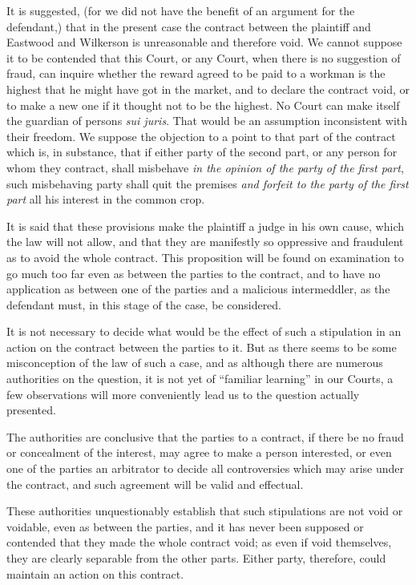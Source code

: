 \documentclass[
  letterpaper,
  11pt,
  DIV=9,
  openright]{scrbook}
\begin{document}
It is suggested, (for we did not have the benefit of an argument for the
defendant,) that in the present case the contract between the plaintiff
and Eastwood and Wilkerson is unreasonable and therefore void. We cannot
suppose it to be contended that this Court, or any Court, when there is
no suggestion of fraud, can inquire whether the reward agreed to be paid
to a workman is the highest that he might have got in the market, and to
declare the contract void, or to make a new one if it thought not to be
the highest. No Court can make itself the guardian of persons \emph{sui
juris}. That would be an assumption inconsistent with their freedom. We
suppose the objection to a point to that part of the contract which is,
in substance, that if either party of the second part, or any person for
whom they contract, shall misbehave \emph{in the opinion of the party of
the first part}, such misbehaving party shall quit the premises
\emph{and forfeit to the party of the first part} all his interest in
the common crop.

It is said that these provisions make the plaintiff a judge in his own
cause, which the law will not allow, and that they are manifestly so
oppressive and fraudulent as to avoid the whole contract. This
proposition will be found on examination to go much too far even as
between the parties to the contract, and to have no application as
between one of the parties and a malicious intermeddler, as the
defendant must, in this stage of the case, be considered.

It is not necessary to decide what would be the effect of such a
stipulation in an action on the contract between the parties to it. But
as there seems to be some misconception of the law of such a case, and
as although there are numerous authorities on the question, it is not
yet of ``familiar learning'' in our Courts, a few observations will more
conveniently lead us to the question actually presented.

The authorities are conclusive that the parties to a contract, if there
be no fraud or concealment of the interest, may agree to make a person
interested, or even one of the parties an arbitrator to decide all
controversies which may arise under the contract, and such agreement
will be valid and effectual.

These authorities unquestionably establish that such stipulations are
not void or voidable, even as between the parties, and it has never been
supposed or contended that they made the whole contract void; as even if
void themselves, they are clearly separable from the other parts. Either
party, therefore, could maintain an action on this contract.
\end{document}

